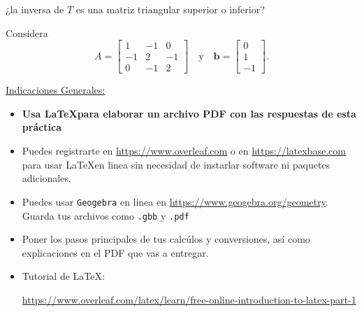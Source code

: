 \documentclass[addpoints,12pt]{exam}
\begin{document}
\begin{questions}
\begin{parts}
¿la inversa de $T$ es una matriz triangular superior o inferior?
\end{parts}

\question[2]
Considera
$$A=
\left[\begin{array}{rrr}
  1 & -1 & 0   \\  -1 & 2 & -1  \\ 0  &-1  &2  
\end{array} \right]\quad\text{y}\quad
\bm b = \left[\begin{array}{r} 0 \\ 1 \\ -1 \end{array}\right].$$


\end{questions}
\newpage

\underline{Indicaciones Generales:}
\begin{itemize}
\item {\bf Usa \LaTeX para elaborar un archivo PDF con las respuestas de 
 esta práctica}
\item Puedes registrarte en
\url{https://www.overleaf.com} o en \url{https://latexbase.com} para usar 
\LaTeX en linea sin necesidad de instarlar software ni paquetes adicionales. 
\item Puedes usar {\tt Geogebra} en linea en 
 \url{https://www.geogebra.org/geometry}. Guarda tus archivos como {\tt .gbb} 
 y {\tt .pdf}
\item Poner los pasos principales de tus calcúlos y conversiones, así como
explicaciones en el PDF que vas a entregar.
\item Tutorial de \LaTeX:

\url{https://www.overleaf.com/latex/learn/free-online-introduction-to-latex-part-1}
\end{itemize}
\end{document}
